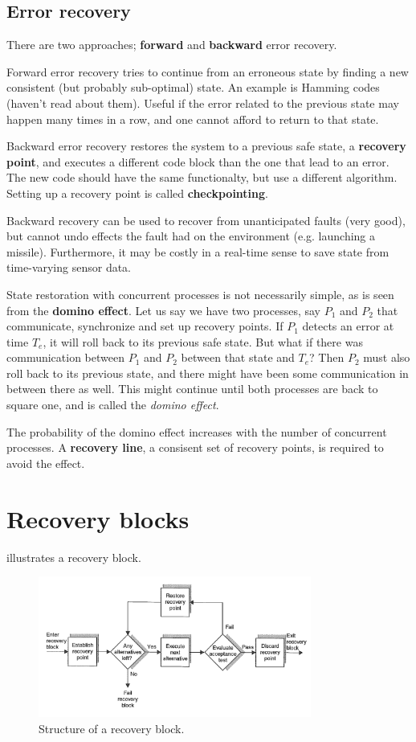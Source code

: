 \subsection{Error recovery}
There are two approaches; \textbf{forward} and \textbf{backward} error recovery.

Forward error recovery tries to continue from an erroneous state by finding a new consistent (but probably sub-optimal) state.  An example is Hamming codes (haven't read about them). Useful if the error related to the previous state may happen many times in a row, and one cannot afford to return to that state.

Backward error recovery restores the system to a previous safe state, a \textbf{recovery point}, and executes a different code block than the one that lead to an error. The new code should have the same functionalty, but use a different algorithm. Setting up a recovery point is called \textbf{checkpointing}.

Backward recovery can be used to recover from unanticipated faults (very good), but cannot undo effects the fault had on the environment (e.g. launching a missile). Furthermore, it may be costly in a real-time sense to save state from time-varying sensor data.

State restoration with concurrent processes is not necessarily simple, as is seen from the \textbf{domino effect}. Let us say we have two processes, say $P_1$ and $P_2$ that communicate, synchronize and set up recovery points. If $P_1$ detects an error at time $T_e$, it will roll back to its previous safe state. But what if there was communication between $P_1$ and $P_2$ between that state and $T_e$? Then $P_2$ must also roll back to its previous state, and there might have been some communication in between there as well. This might continue until both processes are back to square one, and is called the \emph{domino effect}. 

The probability of the domino effect increases with the number of concurrent processes. A \textbf{recovery line}, a consisent set of recovery points, is required to avoid the effect.

\section{Recovery blocks}
 illustrates a recovery block.
\begin{figure}
    \centering
    \includegraphics[width=0.8\textwidth]{figures/recovery_block.png}
    \caption{Structure of a recovery block.}
    \label{fig:recovery_block}
\end{figure}

